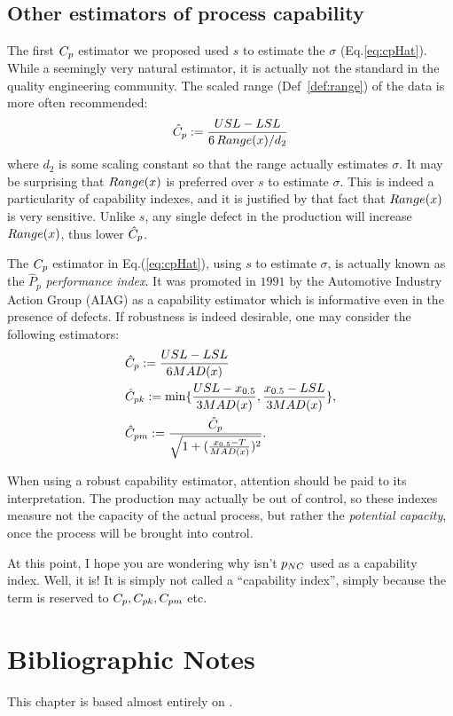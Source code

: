 \subsection{Other estimators of process capability}
\label{sec:cp_estimators}

The first $C_p$ estimator we proposed used $s$ to estimate the $\sigma$ (Eq.\ref{eq:cpHat}).
While a seemingly very natural estimator, it is actually not the standard in the quality engineering community. 
The scaled range (Def~\ref{def:range}) of the data is more often recommended: 
\begin{align}
	\hat{C}_p &:= \frac{USL-LSL}{6 \, Range(x)/d_2} \\
\end{align}
where $d_2$ is some scaling constant so that the range actually estimates $\sigma$. 
It may be surprising that $Range(x)$ is preferred over $s$ to estimate $\sigma$. This is indeed a particularity of capability indexes, and it is justified by that fact that $Range(x)$ is very sensitive. 
Unlike $s$, any single defect in the production will increase $Range(x)$, thus lower $\hat{C}_p$. 


The $C_p$ estimator in Eq.(\ref{eq:cpHat}), using $s$ to estimate $\sigma$, is actually known as the $\hat{P}_p$ \emph{performance index}.
It was promoted in $1991$ by the Automotive Industry Action Group (AIAG) as a capability estimator which is informative even in the presence of defects.
If robustness is indeed desirable, one may consider the following estimators:
\begin{align}
\label{eq:robust_capability}
& \hat{C}_p := \frac{USL-LSL}{6 MAD(x)} \\
& \hat{C}_{pk} := \min\{ \frac{USL- x_{0.5}}{3 MAD(x)},\frac{x_{0.5}-LSL}{3 MAD(x)} \}, \\
& \hat{C}_{pm} := \frac{\hat{C}_p}{\sqrt{1+(\frac{x_{0.5}-T}{MAD(x)})^2}}. 
\end{align}

When using a robust capability estimator, attention should be paid to its interpretation. 
The production may actually be out of control, so these indexes measure not the capacity of the actual process, but rather the \emph{potential capacity}, once the process will be brought into control.





\begin{remark}
At this point, I hope you are wondering why isn't $p_{NC}$ used as a capability index. 
Well, it is! 
It is simply not called a ``capability index'', simply because the term is reserved to $C_p, C_{pk}, C_{pm}$ etc.
\end{remark}



\section{Bibliographic Notes}
This chapter is based almost entirely on \cite{montgomery_introduction_2007}.